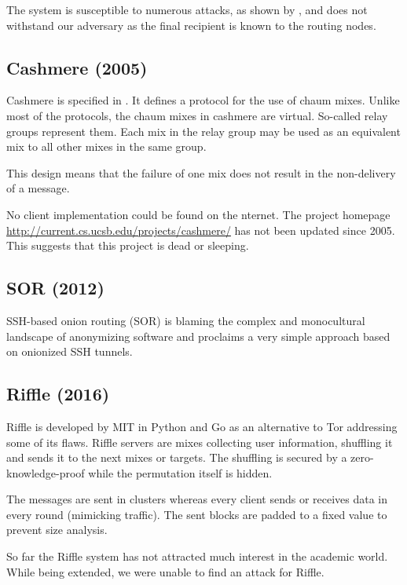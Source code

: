 The system is susceptible to numerous attacks, as shown by \cite{ccs2008:mittal}, and does not withstand our adversary as the final recipient is known to the routing nodes.

\subsection{Cashmere (2005)}
Cashmere is specified in \cite{zhuang2005cashmere}. It defines a protocol for the use of chaum mixes. Unlike most of the protocols, the chaum mixes in cashmere are virtual. So-called relay groups represent them. Each mix in the relay group may be used as an equivalent mix to all other mixes in the same group. 

This design means that the failure of one mix does not result in the non-delivery of a message.

No client implementation could be found on the \textit{}nternet. The project homepage \href{http://current.cs.ucsb.edu/projects/cashmere/}{http://current.cs.ucsb.edu/projects/cashmere/} has not been updated since 2005. This suggests that this project is dead or sleeping.

\subsection{SOR (2012)}
SSH-based onion routing (SOR)\cite{Egners_2012} is blaming the complex and monocultural landscape of anonymizing software and proclaims a very simple approach based on onionized SSH tunnels. 

\subsection{Riffle (2016)}
Riffle\cite{kwon2016riffle} is developed by MIT in Python and Go as an alternative to Tor addressing some of its flaws. Riffle servers are mixes collecting user information, shuffling it and sends it to the next mixes or targets. The shuffling is secured by a zero-knowledge-proof while the permutation itself is hidden.

The messages are sent in clusters whereas every client sends or receives data in every round (mimicking traffic). The sent blocks are padded to a fixed value to prevent size analysis. 

So far the Riffle system has not attracted much interest in the academic world. While being extended, we were unable to find an attack for Riffle.


